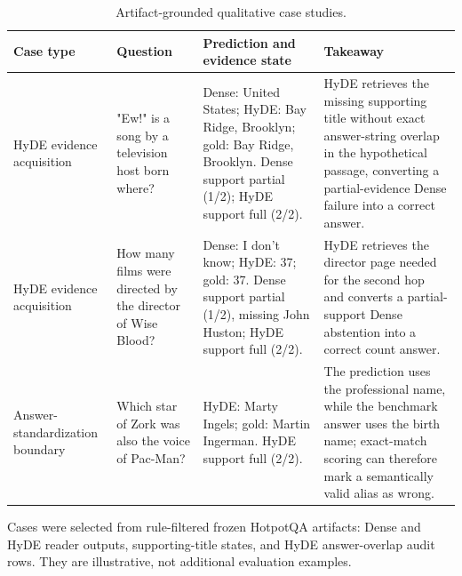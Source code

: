 \begin{table}[t]
\centering
\caption{Artifact-grounded qualitative case studies.}
\label{tab:qualitative_cases}
\footnotesize
\begin{threeparttable}
\setlength{\tabcolsep}{2.5pt}
\renewcommand{\arraystretch}{1.08}
\begin{tabularx}{\textwidth}{>{\raggedright\arraybackslash}p{}
                            >{\raggedright\arraybackslash}p{}
                            >{\raggedright\arraybackslash}p{}
                            >{\raggedright\arraybackslash}X}
\toprule
Case type & Question & Prediction and evidence state & Takeaway \\
\midrule
HyDE evidence acquisition & "Ew!" is a song by a television host born where? & Dense: United States; HyDE: Bay Ridge, Brooklyn; gold: Bay Ridge, Brooklyn. Dense support partial (1/2); HyDE support full (2/2). & HyDE retrieves the missing supporting title without exact answer-string overlap in the hypothetical passage, converting a partial-evidence Dense failure into a correct answer. \\
HyDE evidence acquisition & How many films were directed by the director of Wise Blood? & Dense: I don't know; HyDE: 37; gold: 37. Dense support partial (1/2), missing John Huston; HyDE support full (2/2). & HyDE retrieves the director page needed for the second hop and converts a partial-support Dense abstention into a correct count answer. \\
Answer-standardization boundary & Which star of Zork was also the voice of Pac-Man? & HyDE: Marty Ingels; gold: Martin Ingerman. HyDE support full (2/2). & The prediction uses the professional name, while the benchmark answer uses the birth name; exact-match scoring can therefore mark a semantically valid alias as wrong. \\
\bottomrule
\end{tabularx}
\begin{tablenotes}
\footnotesize
\item Cases were selected from rule-filtered frozen HotpotQA artifacts: Dense and HyDE reader outputs, supporting-title states, and HyDE answer-overlap audit rows. They are illustrative, not additional evaluation examples.
\end{tablenotes}
\end{threeparttable}
\end{table}
